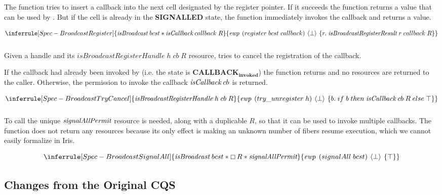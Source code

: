 The  function tries to insert a callback into the next cell designated by the register pointer.
If it succeeds the function returns a  value that can be used by .
But if the cell is already in the \textbf{SIGNALLED} state, the function immediately invokes the callback and returns a  value.

\[
  \inferrule[Spec-BroadcastRegister]
  { \gsIsBcst{}\; bcst \ast \gsIsCb{}\; callback\; R }
  { \ewp{register\; bcst\; callback}{\bot}{r.\; \emph{isBroadcastRegisterResult}\; r\; callback\; R}}
\]

\subsubsection{}
\label{sec:broadcast-spec-cance}

Given a handle and its \(\textit{isBroadcastRegisterHandle}\; h\; cb\; R\) resource,  tries to cancel the registration of the callback.

If the callback had already been invoked by  (i.e. the state is \(\textbf{CALLBACK}_\textbf{invoked}\)) the function returns  and no resources are returned to the caller.
Otherwise, the permission to invoke the callback \(\emph{isCallback}{}\; cb\) is returned.

\[
  \inferrule[Spec-BroadcastTryCancel]
  { \emph{isBroadcastRegisterHandle}\; h\; cb\; R }
  { \ewp{try\_unregister\; h}{\bot}{b.\; if\; b\; then\; \gsIsCb{}\; cb\; R\; else\; \top}}
\]

\subsubsection{}
\label{sec:broadcast-spec-signal-all}

To call  the unique \(\emph{signalAllPermit}{}\) resource is needed, along with a duplicable \(R\), so that it can be used to invoke multiple callbacks.
The function does not return any resources because its only effect is making an unknown number of fibers resume execution, which we cannot easily formalize in Iris.

\[
  \inferrule[Spec-BroadcastSignalAll]
  { \gsIsBcst{}\; bcst \ast \always R \ast \gssignal{}}
  { \ewp{signalAll\; bcst}{\bot}{\top} }
\]

\subsection{Changes from the Original CQS}
\label{sec:broadcast-spec-removed-features}

